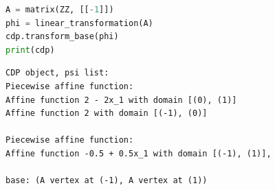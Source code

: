 \documentclass[fontsize=14pt]{scrartcl}
\theoremstyle{definition}
\begin{document}

\begin{lstlisting}[language=Python,style=python]
A = matrix(ZZ, [[-1]])
phi = linear_transformation(A)
cdp.transform_base(phi)
print(cdp)
\end{lstlisting}

\begin{lstlisting}[style=output]
CDP object, psi list:
Piecewise affine function:
Affine function 2 - 2x_1 with domain [(0), (1)]
Affine function 2 with domain [(-1), (0)]

Piecewise affine function:
Affine function -0.5 + 0.5x_1 with domain [(-1), (1)],

base: (A vertex at (-1), A vertex at (1))
\end{lstlisting}
\end{document}
